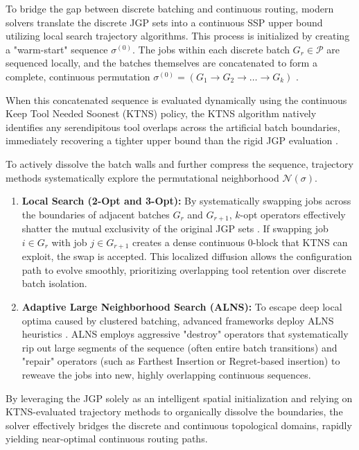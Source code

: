 \documentclass[11pt, a4paper]{book}
\begin{document}
	To bridge the gap between discrete batching and continuous routing, modern solvers translate the discrete JGP sets into a continuous SSP upper bound utilizing local search trajectory algorithms. This process is initialized by creating a "warm-start" sequence $\sigma^{(0)}$. The jobs within each discrete batch $G_r \in \mathcal{P}$ are sequenced locally, and the batches themselves are concatenated to form a complete, continuous permutation $\sigma^{(0)} = (G_1 \to G_2 \to \dots \to G_k)$ %
	. 
	
	When this concatenated sequence is evaluated dynamically using the continuous Keep Tool Needed Soonest (KTNS) policy, the KTNS algorithm natively identifies any serendipitous tool overlaps across the artificial batch boundaries, immediately recovering a tighter upper bound than the rigid JGP evaluation %
	.
	
	To actively dissolve the batch walls and further compress the sequence, trajectory methods systematically explore the permutational neighborhood $\mathcal{N}(\sigma)$.
	\begin{enumerate}
		\item \textbf{Local Search (2-Opt and 3-Opt):} By systematically swapping jobs across the boundaries of adjacent batches $G_r$ and $G_{r+1}$, $k$-opt operators effectively shatter the mutual exclusivity of the original JGP sets %
		. If swapping job $i \in G_r$ with job $j \in G_{r+1}$ creates a dense continuous 0-block that KTNS can exploit, the swap is accepted. This localized diffusion allows the configuration path to evolve smoothly, prioritizing overlapping tool retention over discrete batch isolation.
		\item \textbf{Adaptive Large Neighborhood Search (ALNS):} To escape deep local optima caused by clustered batching, advanced frameworks deploy ALNS heuristics %
		. ALNS employs aggressive "destroy" operators that systematically rip out large segments of the sequence (often entire batch transitions) and "repair" operators (such as Farthest Insertion or Regret-based insertion) to reweave the jobs into new, highly overlapping continuous sequences. 
	\end{enumerate}
	
	By leveraging the JGP solely as an intelligent spatial initialization and relying on KTNS-evaluated trajectory methods to organically dissolve the boundaries, the solver effectively bridges the discrete and continuous topological domains, rapidly yielding near-optimal continuous routing paths.
	
\end{document}
